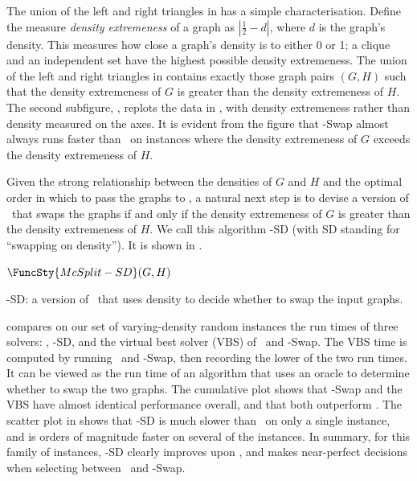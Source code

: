 The union of the left and right triangles in
 has a simple characterisation.
Define the measure \emph{density extremeness} of
a graph as $\left|\frac{1}{2} - d\right|$, where $d$ is the graph's
density.  This measures how close a graph's
density is to either 0 or 1; a clique and an independent set
have the highest possible density extremeness.  The union of the left and right triangles
in  contains exactly those
graph pairs $(G,H)$ such that the density extremeness of $G$ is greater than
the density extremeness of $H$.
The second subfigure, ,
replots the data in ,
with density extremeness rather than density measured on the axes.
It is evident from the figure that \McSplit-Swap almost always
runs faster than \McSplit\ on instances where the density extremeness of $G$
exceeds the density extremeness of $H$.

Given the strong relationship between the densities of $G$ and $H$ and the 
optimal order in which to pass the graphs to \McSplit, a natural next
step is to devise a version of \McSplit\ that swaps the graphs
if and only if the density extremeness of $G$ is greater
than the density extremeness of $H$.  We call this algorithm
\McSplit-SD (with SD standing for ``swapping on density''). It is shown in .

\begin{algorithm}[h!]
\AlgorithmFontSizeB
\DontPrintSemicolon
\nl $\FuncSty{McSplit-SD}(G, H)$ \label{McSplitSDFun} \;
\nl {}
    \caption{\McSplit-SD: a version of \McSplit\ that uses density to decide whether to swap the input graphs.} 
\label{McSplitSDAlg}
\end{algorithm}

 compares on our set of varying-density random instances
the run times of three solvers: \McSplit, \McSplit-SD, and the virtual best solver (VBS) of
\McSplit\ and \McSplit-Swap. The VBS time is computed by running \McSplit\ and
\McSplit-Swap, then recording the lower of the two run times.  It can be viewed as the run time
of an algorithm that uses an oracle to determine whether to swap the two graphs.
The cumulative plot shows that \McSplit-Swap and the VBS
have almost identical performance overall, and that both outperform \McSplit.  The scatter
plot in  shows that \McSplit-SD is much slower than
\McSplit\ on only a single instance, and is orders of magnitude faster on several of the
instances.  In summary, for this family of instances, \McSplit-SD clearly improves upon
\McSplit, and makes near-perfect decisions when selecting between \McSplit\ and \McSplit-Swap.

